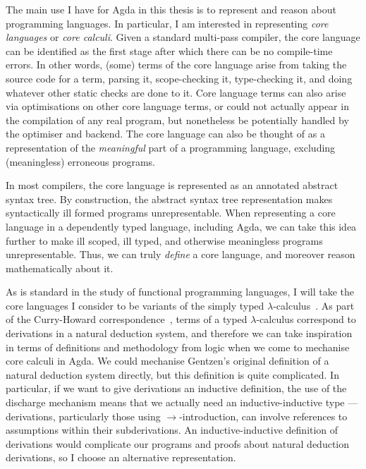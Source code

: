 The main use I have for Agda in this thesis is to represent and reason about
programming languages.
In particular, I am interested in representing \emph{core languages} or
\emph{core calculi}.
Given a standard multi-pass compiler, the core language can be identified as the
first stage after which there can be no compile-time errors.
In other words, (some) terms of the core language arise from taking the source
code for a term, parsing it, scope-checking it, type-checking it, and doing
whatever other static checks are done to it.
Core language terms can also arise via optimisations on other core language
terms, or could not actually appear in the compilation of any real program, but
nonetheless be potentially handled by the optimiser and backend.
The core language can also be thought of as a representation of the
\emph{meaningful} part of a programming language, excluding (meaningless)
erroneous programs.

In most compilers, the core language is represented as an annotated abstract
syntax tree.
By construction, the abstract syntax tree representation makes syntactically
ill formed programs unrepresentable.
When representing a core language in a dependently typed language, including
Agda, we can take this idea further to make ill scoped, ill typed, and otherwise
meaningless programs unrepresentable.
Thus, we can truly \emph{define} a core language, and moreover reason
mathematically about it.

As is standard in the study of functional programming languages, I will take the
core languages I consider to be variants of the simply typed
$\lambda$-calculus~\citep{Church40,Barendregt93}.
As part of the Curry-Howard correspondence~\citep{Howard80}, terms of a typed
$\lambda$-calculus correspond to derivations in a natural deduction system, and
therefore we can take inspiration in terms of definitions and methodology from
logic when we come to mechanise core calculi in Agda.
We could mechanise Gentzen's original definition of a natural deduction system
directly, but this definition is quite complicated.
In particular, if we want to give derivations an inductive definition, the use
of the discharge mechanism means that we actually need an inductive-inductive
type --- derivations, particularly those using $\to$-introduction, can involve
references to assumptions within their subderivations.
An inductive-inductive definition of derivations would complicate our programs
and proofs about natural deduction derivations, so I choose an alternative
representation.

